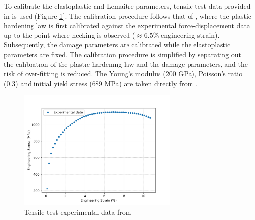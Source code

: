 \documentclass[sn-mathphys,Numbered]{sn-jnl}%
\begin{document}
To calibrate the elastoplastic and Lemaitre parameters, tensile test data provided in \citet{roh_process_2021} is used (Figure \ref{fig:roh_tensile_test}).
The calibration procedure follows that of \citet{masse_study_2010}, where the plastic hardening law is first calibrated against the experimental force-displacement data up to the point where necking is observed ($\approx6.5\%$ engineering strain).
Subsequently, the damage parameters are calibrated while the elastoplastic parameters are fixed.
The calibration procedure is simplified by separating out the calibration of the plastic hardening law and the damage parameters, and the risk of over-fitting is reduced.
The Young's modulus (200 GPa), Poisson's ratio (0.3) and initial yield stress (689 MPa) are taken directly from \citet{roh_process_2021}.
\begin{figure}[htbp]
\begin{center}
	\includegraphics[width=0.7\textwidth]{./Figures/SimulationAndAnalysis/compareExperimentalSimulation/experimentalData.png}
\caption{Tensile test experimental data from \citet{roh_process_2021}}
\label{fig:roh_tensile_test}
\end{center}
\end{figure}
\end{document}
